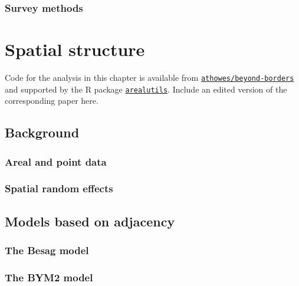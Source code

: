 \documentclass[a4paper, nobind]{templates/ociamthesis}
\begin{document}
\hypertarget{survey-methods}{%
\subsection{Survey methods}\label{survey-methods}}

\hypertarget{beyond-borders}{%
\chapter{Spatial structure}\label{beyond-borders}}

\adjustmtc
{}

Code for the analysis in this chapter is available from \href{https://github.com/athowes/beyond-borders}{\texttt{athowes/beyond-borders}} and supported by the R package \href{https://athowes.github.io/arealutils}{\texttt{arealutils}}.
Include an edited version of the corresponding paper here.

\hypertarget{background-1}{%
\section{Background}\label{background-1}}

\hypertarget{areal-and-point-data}{%
\subsection{Areal and point data}\label{areal-and-point-data}}

\hypertarget{spatial-random-effects}{%
\subsection{Spatial random effects}\label{spatial-random-effects}}

\hypertarget{models-based-on-adjacency}{%
\section{Models based on adjacency}\label{models-based-on-adjacency}}

\hypertarget{the-besag-model}{%
\subsection{The Besag model}\label{the-besag-model}}

\hypertarget{the-bym2-model}{%
\subsection{The BYM2 model}\label{the-bym2-model}}
\end{document}
